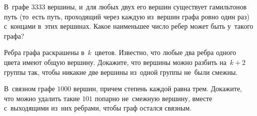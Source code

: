 \begin{problems}
\item
В~графе $3333$ вершины, и~для любых двух его вершин существует гамильтонов путь
(то~есть путь, проходящий через каждую из~вершин графа ровно один раз)
с~концами в~этих вершинах.
Какое наименьшее число ребер может быть у~такого графа?

\item
Ребра графа раскрашены в~$k$~цветов.
Известно, что любые два ребра одного цвета имеют общую вершину.
Докажите, что вершины можно разбить на~$k + 2$ группы так, чтобы никакие две
вершины из~одной группы не~были смежны.

\item
В~связном графе $1000$ вершин, причем степень каждой равна трем.
Докажите, что можно удалить такие $101$ попарно не~смежную вершину, вместе
с~выходящими из~них ребрами, чтобы граф остался связным.

\end{problems}

